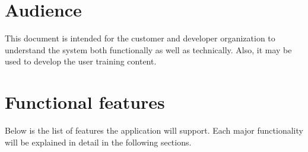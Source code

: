 \documentclass[hidelinks,a4paper]{article}
\begin{document}
	\section{Audience}
	This document is intended for the customer and developer organization to understand the system both functionally as well as technically. Also, it may be used to develop the user training content.
	
	\section{Functional features} 
	Below is the list of features the application will support. Each major functionality will be explained in detail in the following sections.
	
	\subsectionfont{\color{levelfirst}}
\end{document}
